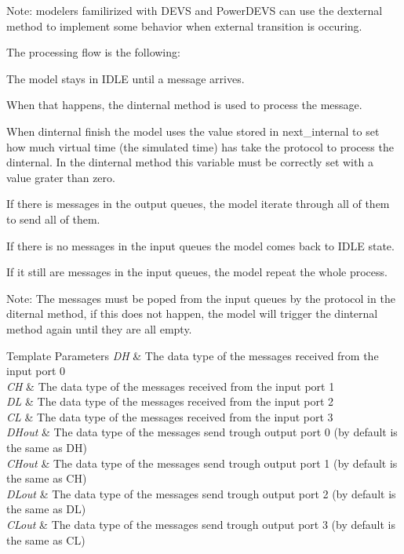 Note\+: modelers familirized with D\+E\+VS and Power\+D\+E\+VS can use the dexternal method to implement some behavior when external transition is occuring.

The processing flow is the following\+:
\begin{DoxyEnumerate}
\item The model stays in I\+D\+LE until a message arrives.
\item When that happens, the dinternal method is used to process the message.
\item When dinternal finish the model uses the value stored in next\+\_\+internal to set how much virtual time (the simulated time) has take the protocol to process the dinternal. In the dinternal method this variable must be correctly set with a value grater than zero.
\item If there is messages in the output queues, the model iterate through all of them to send all of them.
\item If there is no messages in the input queues the model comes back to I\+D\+LE state.
\item If it still are messages in the input queues, the model repeat the whole process.
\end{DoxyEnumerate}

Note\+: The messages must be poped from the input queues by the protocol in the diternal method, if this does not happen, the model will trigger the dinternal method again until they are all empty.


\begin{DoxyTemplParams}{Template Parameters}
{\em DH} & The data type of the messages received from the input port 0 \\
\hline
{\em CH} & The data type of the messages received from the input port 1 \\
\hline
{\em DL} & The data type of the messages received from the input port 2 \\
\hline
{\em CL} & The data type of the messages received from the input port 3 \\
\hline
{\em D\+Hout} & The data type of the messages send trough output port 0 (by default is the same as DH) \\
\hline
{\em C\+Hout} & The data type of the messages send trough output port 1 (by default is the same as CH) \\
\hline
{\em D\+Lout} & The data type of the messages send trough output port 2 (by default is the same as DL) \\
\hline
{\em C\+Lout} & The data type of the messages send trough output port 3 (by default is the same as CL) \\
\hline
\end{DoxyTemplParams}


